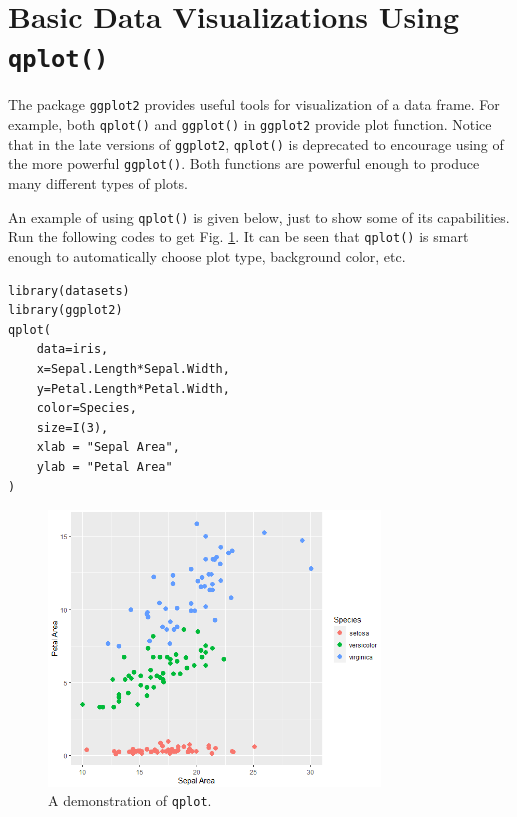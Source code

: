 \section{Basic Data Visualizations Using \texttt{qplot()}} \label{ch:r1:sec:qplot}

The package \verb|ggplot2| provides useful tools for visualization of a data frame. For example, both \verb|qplot()| and \verb|ggplot()| in \verb|ggplot2| provide plot function. Notice that in the late versions of \verb|ggplot2|, \verb|qplot()| is deprecated to encourage using of the more powerful \verb|ggplot()|. Both functions are powerful enough to produce many different types of plots.

An example of using \verb|qplot()| is given below, just to show some of its capabilities. Run the following codes to get Fig. \ref{ch:r1:fig:qplot_demo}. It can be seen that \verb|qplot()| is smart enough to automatically choose plot type, background color, etc.
\begin{lstlisting}
library(datasets)
library(ggplot2)
qplot(
    data=iris,
    x=Sepal.Length*Sepal.Width,
    y=Petal.Length*Petal.Width,
    color=Species,
    size=I(3),
    xlab = "Sepal Area",
    ylab = "Petal Area"
)
\end{lstlisting}

\begin{figure}
	\centering
	\includegraphics[width=250pt]{chapters/ch-r/figures/qplot_demo.png}
	\caption{A demonstration of \texttt{qplot}.} \label{ch:r1:fig:qplot_demo}
\end{figure}

